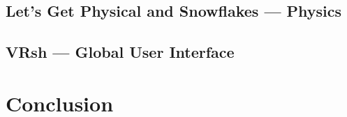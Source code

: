 \documentclass[conference,12pt]{IEEEtran}
\newcommand\name{VRsh}
\begin{document}
\subsection{Let's Get Physical and Snowflakes --- Physics}

\subsection{{\name} --- Global User Interface}

\section{Conclusion}\label{sec:conclusion}

{\printbibliography}
\end{document}
